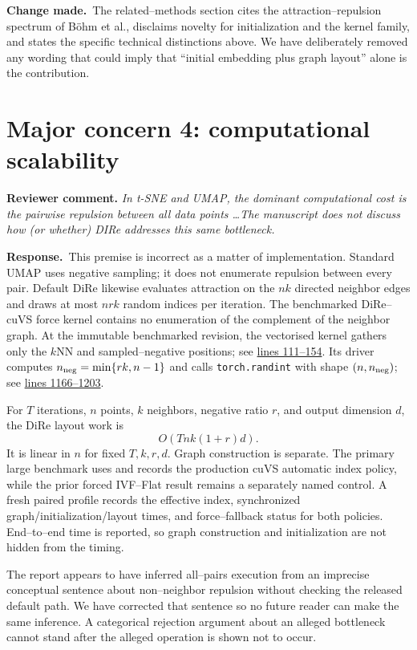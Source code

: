 \documentclass[11pt]{article}
\newcommand{\reviewcomment}[1]{%
  \medskip\noindent\textbf{Reviewer comment.} \emph{#1}\par\smallskip}
\newcommand{\response}{%
  \noindent\textcolor{responseblue}{\textbf{Response.}}\ }
\newcommand{\change}{%
  \noindent\textcolor{responseblue}{\textbf{Change made.}}\ }
\begin{document}
\change The related--methods section cites the attraction--repulsion spectrum
of Böhm et al., disclaims novelty for initialization and the kernel family, and
states the specific technical distinctions above. We have deliberately removed
any wording that could imply that ``initial embedding plus graph layout'' alone
is the contribution.

\section*{Major concern 4: computational scalability}

\reviewcomment{In t-SNE and UMAP, the dominant computational cost is the
pairwise repulsion between all data points \ldots The manuscript does not
discuss how (or whether) DIRe addresses this same bottleneck.}

\response This premise is incorrect as a matter of implementation. Standard
UMAP uses negative sampling; it does not enumerate repulsion between every
pair. Default DiRe likewise evaluates attraction on the $nk$ directed neighbor
edges and draws at most $nrk$ random indices per iteration. The benchmarked
DiRe--cuVS force kernel contains no enumeration of the complement of the
neighbor graph. At the immutable benchmarked revision, the vectorised kernel
gathers only the $k$NN and sampled--negative positions; see
\href{https://github.com/sashakolpakov/dire-rapids/blob/293b622cc79fa8ea6fd5b54009e0930e3385b22f/dire_rapids/dire_pytorch.py\#L111-L154}
{lines 111--154}. Its driver computes
$n_{\rm neg}=\min\{rk,n-1\}$ and calls \texttt{torch.randint} with shape
$(n,n_{\rm neg})$; see
\href{https://github.com/sashakolpakov/dire-rapids/blob/293b622cc79fa8ea6fd5b54009e0930e3385b22f/dire_rapids/dire_pytorch.py\#L1166-L1203}
{lines 1166--1203}.

For $T$ iterations, $n$ points, $k$ neighbors, negative ratio $r$, and output
dimension $d$, the DiRe layout work is
\[
  O\!\left(Tnk(1+r)d\right).
\]
It is linear in $n$ for fixed $T,k,r,d$. Graph construction is separate. The
primary large benchmark uses and records the production cuVS automatic index
policy, while the prior forced IVF--Flat result remains a separately named
control. A fresh paired profile records the effective index, synchronized
graph/initialization/layout times, and force--fallback status for both policies.
End--to--end time is reported, so graph construction and initialization are not
hidden from the timing.

The report appears to have inferred all--pairs execution from an imprecise
conceptual sentence about non--neighbor repulsion without checking the released
default path. We have corrected that sentence so no future reader can make the
same inference. A categorical rejection argument about an alleged bottleneck
cannot stand after the alleged operation is shown not to occur.
\end{document}
